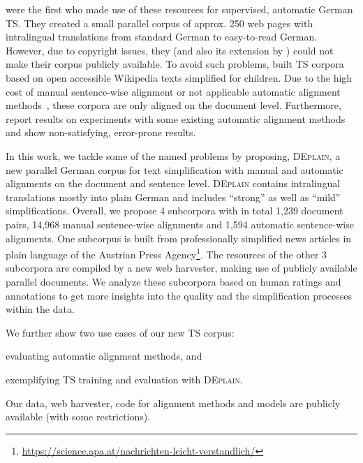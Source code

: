 \documentclass[11pt]{article}
\begin{document}
\citet{klaper-etal-2013-building} were the first who made use of these resources for supervised, automatic German TS. They created a small parallel corpus of approx. 250 web pages with intralingual translations from standard German to easy-to-read German. However, due to copyright issues, they (and also its extension by \citet{battisti-etal-2020-corpus}) could not 
  make their corpus publicly available. To avoid such problems, 
  \citet{hewett-stede-2021-automatically,aumiller-gertz-2022-klexikon} built TS 
   corpora based on open accessible Wikipedia texts simplified for children. Due to the high cost of manual sentence-wise alignment or not applicable automatic alignment methods~\cite{aumiller-gertz-2022-klexikon}, these corpora are only aligned on the document level. Furthermore, \citet{spring-etal-2022-ensembling} report results on experiments with some existing automatic alignment methods and show non-satisfying, error-prone results. \par

In this work, we tackle some of the named problems by proposing, \textsc{DEplain}, a new parallel German corpus for text simplification with manual and automatic alignments on the document and sentence level. \textsc{DEplain} contains intralingual translations mostly into plain German and includes ``strong'' as well as ``mild'' simplifications. Overall, we propose 4 subcorpora with in total 1,239 document pairs,  14,968 manual sentence-wise alignments and 1,594 automatic sentence-wise alignments. One subcorpus is built from professionally simplified news articles in plain language of the Austrian Press Agency\footnote{\url{https://science.apa.at/nachrichten-leicht-verstandlich/}}. The resources of the other 3 subcorpora are compiled by a new web harvester, making use of publicly available parallel documents. We analyze these subcorpora based on human ratings and annotations to get more insights into the quality and the simplification processes within the data. 

We further show two use cases of our new TS corpus: 
\begin{enumerate*}[label=\roman*)]
    \item evaluating automatic alignment methods, and
    \item exemplifying TS training and evaluation with \textsc{DEplain}. 
\end{enumerate*}
Our data, web harvester, code for alignment methods and models are publicly available (with some restrictions).
\end{document}
